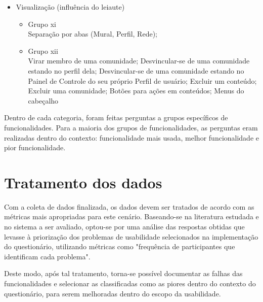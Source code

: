 \begin{itemize}
\item Visualização (influência do leiaute) \\
    \begin{itemize}
    \item Grupo xi\\
    Separação por abas (Mural, Perfil, Rede); 
    \item Grupo xii\\
    Virar membro de uma comunidade; Desvincular-se de uma comunidade estando no perfil dela; Desvincular-se de uma comunidade estando no Painel de Controle do seu próprio Perfil de usuário; Excluir um conteúdo; Excluir uma comunidade; Botões para ações em conteúdos; Menus do cabeçalho
    \end{itemize}

\end{itemize}

	Dentro de cada categoria, foram feitas perguntas a grupos específicos de funcionalidades. Para a maioria dos grupos de funcionalidades, as perguntas eram realizadas dentro do contexto: funcionalidade mais usada, melhor funcionalidade e pior funcionalidade.



\section{Tratamento dos dados}
\label{sec:trat-dados}
    
    Com a coleta de dados finalizada, os dados devem ser tratados de acordo com as métricas mais apropriadas para este cenário. Baseando-se na literatura estudada e no sistema a ser avaliado, optou-se por uma análise das respostas obtidas que levasse à priorização dos problemas de usabilidade selecionados na implementação do questionário, utilizando métricas como "frequência de participantes que identificam cada problema". 
    
    Deste modo, após tal tratamento, torna-se possível documentar as falhas das funcionalidades e selecionar as classificadas como as piores dentro do contexto do questionário, para serem melhoradas dentro do escopo da usabilidade.

